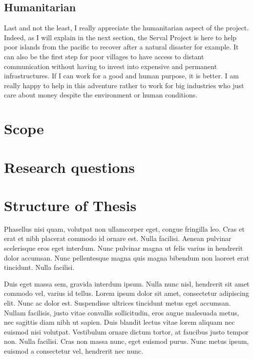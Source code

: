 \subsection{Humanitarian}
Last and not the least, I really appreciate the humanitarian aspect of the project. Indeed, as I will explain in the next section, the Serval Project is here to help poor islands from the pacific to recover after a natural disaster for example. It can also be the first step for poor villages to have access to distant communication without having to invest into expensive and permanent infrastructures. If I can work for a good and human purpose, it is better. I am really happy to help in this adventure rather to work for big industries who just care about money despite the environment or human conditions. 

\section{Scope}

\section{Research questions}

\section{Structure of Thesis}


Phasellus nisi quam, volutpat non ullamcorper eget, congue fringilla leo. Cras et erat et nibh placerat commodo id ornare est. Nulla facilisi. Aenean pulvinar scelerisque eros eget interdum. Nunc pulvinar magna ut felis varius in hendrerit dolor accumsan. Nunc pellentesque magna quis magna bibendum non laoreet erat tincidunt. Nulla facilisi.

Duis eget massa sem, gravida interdum ipsum. Nulla nunc nisl, hendrerit sit amet commodo vel, varius id tellus. Lorem ipsum dolor sit amet, consectetur adipiscing elit. Nunc ac dolor est. Suspendisse ultrices tincidunt metus eget accumsan. Nullam facilisis, justo vitae convallis sollicitudin, eros augue malesuada metus, nec sagittis diam nibh ut sapien. Duis blandit lectus vitae lorem aliquam nec euismod nisi volutpat. Vestibulum ornare dictum tortor, at faucibus justo tempor non. Nulla facilisi. Cras non massa nunc, eget euismod purus. Nunc metus ipsum, euismod a consectetur vel, hendrerit nec nunc.